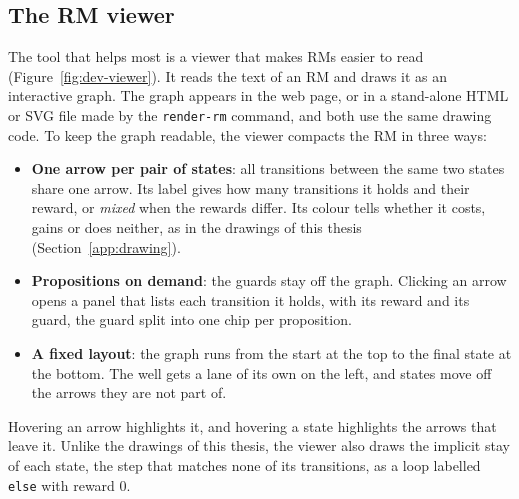 \documentclass[11pt,english,listoffigures,listoftables]{tfgetsinf}
\begin{document}
\subsection{The RM viewer}
\label{app:viewer}
The tool that helps most is a viewer that makes RMs easier to read (Figure~\ref{fig:dev-viewer}). It reads the text of an RM and draws it as an interactive graph. The graph appears in the web page, or in a stand-alone HTML or SVG file made by the \texttt{render-rm} command, and both use the same drawing code. To keep the graph readable, the viewer compacts the RM in three ways:
\begin{itemize}
    \item \textbf{One arrow per pair of states}: all transitions between the same two states share one arrow. Its label gives how many transitions it holds and their reward, or \textit{mixed} when the rewards differ. Its colour tells whether it costs, gains or does neither, as in the drawings of this thesis (Section~\ref{app:drawing}).
    \item \textbf{Propositions on demand}: the guards stay off the graph. Clicking an arrow opens a panel that lists each transition it holds, with its reward and its guard, the guard split into one chip per proposition.
    \item \textbf{A fixed layout}: the graph runs from the start at the top to the final state at the bottom. The well gets a lane of its own on the left, and states move off the arrows they are not part of.
\end{itemize}
Hovering an arrow highlights it, and hovering a state highlights the arrows that leave it. Unlike the drawings of this thesis, the viewer also draws the implicit stay of each state, the step that matches none of its transitions, as a loop labelled \texttt{else} with reward 0.
\end{document}
